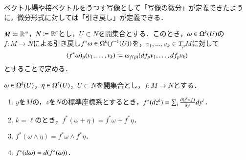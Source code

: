 ベクトル場や接ベクトルをうつす写像として「写像の微分」が定義できたように，微分形式に対しては「引き戻し」が定義できる．

\begin{defi}$M \coloneqq \mathbb{R}^m$，$N \coloneqq \mathbb{R}^n$とし，$U \subset N$を開集合とする．このとき，$\omega \in \Omega^k(U)$の$f \colon M \to N$による引き戻し$f^* \omega \in \Omega^k(f^{-1}(U))$を，$v_1, \dots, v_k \in T_pM$に対して
\begin{equation}
(f^* \omega)_p (v_1, \dots, v_k) \coloneqq \omega_{f(p)} (\mathop{}\!d f_p v_1, \dots, \mathop{}\!d f_p v_k)
\end{equation}とすることで定める．
\end{defi}

\begin{prop}[引き戻しの基本性質] $\omega \in \Omega^k(U)$，$\eta \in \Omega^\ell(U)$，$U \subset N$を開集合とし，$f \colon M \to N$とする．
\begin{enumerate}
\item $y$を$M$の，$z$を$N$の標準座標系とするとき，$f^*(\mathop{}\!d z^k) = \sum_i \frac{\partial (z^k \circ f)}{\partial y^i} dy^i$．
\item $k = \ell$のとき，$f^*(\omega + \eta) = f^* \omega + f^* \eta$．
\item $f^*(\omega \wedge \eta) = f^* \omega \wedge f^* \eta$．
\item $f^*(\mathop{}\!d \omega) = \mathop{}\!d (f^*(\omega))$．
\end{enumerate}
\end{prop}

